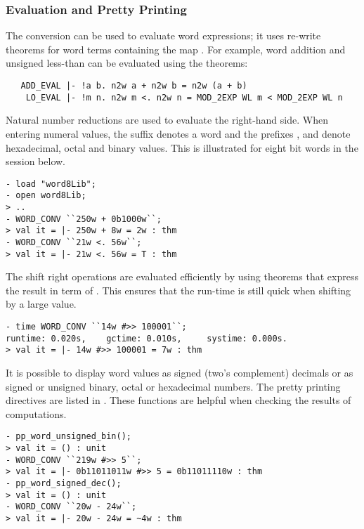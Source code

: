 {\subsubsection{Evaluation and Pretty Printing} \label{eval}

The conversion  can be used to evaluate word
expressions; it uses re-write theorems for word
terms containing the map .  For example, word addition and
unsigned less-than can be evaluated using the theorems:

\begin{hol}
\begin{verbatim}
   ADD_EVAL |- !a b. n2w a + n2w b = n2w (a + b)
    LO_EVAL |- !m n. n2w m <. n2w n = MOD_2EXP WL m < MOD_2EXP WL n
\end{verbatim}
\end{hol}

\noindent Natural number reductions are used to evaluate the right-hand side.
When entering numeral values, the suffix  denotes a word and the
prefixes ,  and  denote hexadecimal, octal and binary values.
This is illustrated for eight bit words in the session below.

\setcounter{sessioncount}{0}
\begin{session}
\begin{verbatim}
- load "word8Lib";
- open word8Lib;
> ..
- WORD_CONV ``250w + 0b1000w``;
> val it = |- 250w + 8w = 2w : thm
- WORD_CONV ``21w <. 56w``;
> val it = |- 21w <. 56w = T : thm
\end{verbatim}
\end{session}

The shift right operations are evaluated efficiently by using theorems
that express the result in term of .  This ensures that the
run-time is still quick when shifting by a large value.

\begin{session}
\begin{verbatim}
- time WORD_CONV ``14w #>> 100001``;
runtime: 0.020s,    gctime: 0.010s,     systime: 0.000s.
> val it = |- 14w #>> 100001 = 7w : thm
\end{verbatim}
\end{session}

It is possible to display word values as signed (two's complement)
decimals or as signed or unsigned binary, octal or hexadecimal
numbers.  The pretty printing directives are listed in \REFERENCE.
These functions are helpful when checking the results of computations.
\begin{session}
\begin{verbatim}
- pp_word_unsigned_bin();
> val it = () : unit
- WORD_CONV ``219w #>> 5``;
> val it = |- 0b11011011w #>> 5 = 0b11011110w : thm
- pp_word_signed_dec();
> val it = () : unit
- WORD_CONV ``20w - 24w``;
> val it = |- 20w - 24w = ~4w : thm
\end{verbatim}
\end{session}

}
